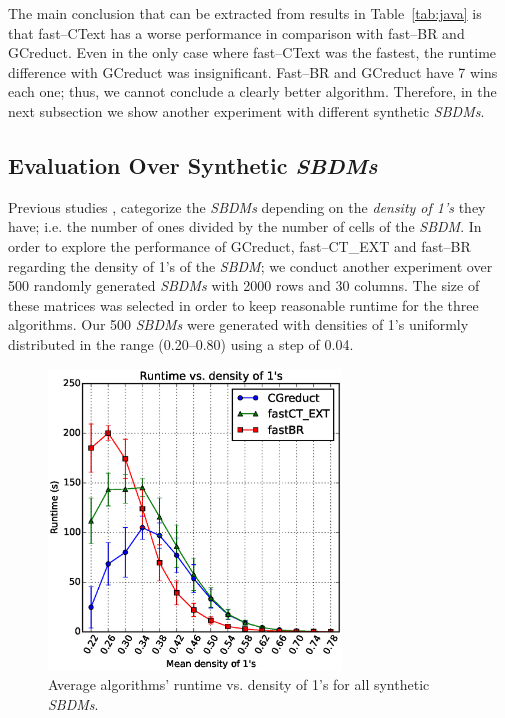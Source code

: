 \documentclass[number,preprint,review,12pt]{elsarticle}
\begin{document}
    The main conclusion that can be extracted from results in Table~\ref{tab:java} is that fast--CText has a worse performance in comparison with fast--BR and GCreduct. Even in the only case where fast--CText was the fastest, the runtime difference with GCreduct was insignificant. Fast--BR and GCreduct have 7 wins each one; thus, we cannot conclude a clearly better algorithm. Therefore, in the next subsection we show another experiment with different synthetic \textit{SBDMs}.
	
\subsection{Evaluation Over Synthetic \textit{SBDMs}}\label{sub:synth}

	Previous studies \citep{Rojas12,Lias13,Rodriguez15}, categorize the \textit{SBDMs} depending on the \emph{density of 1's} they have; i.e. the number of ones divided by the number of cells of the \textit{SBDM}. In order to explore the performance of GCreduct, fast--CT\_EXT and fast--BR regarding the density of 1's of the \textit{SBDM}; we conduct another experiment over 500 randomly generated \textit{SBDMs} with 2000 rows and 30 columns. The size of these matrices was selected in order to keep reasonable runtime for the three algorithms. Our 500 \textit{SBDMs} were generated with densities of 1's uniformly distributed in the range (0.20--0.80) using a step of 0.04. 
				
	\begin{figure}[htb]
		\begin{center}
			\includegraphics[height=8cm]{overal.eps}
		\end{center}
		\caption{Average algorithms' runtime vs. density of 1's for all synthetic \textit{SBDMs}.}
		\label{fig:scattDensity}
	\end{figure}	
\end{document}
